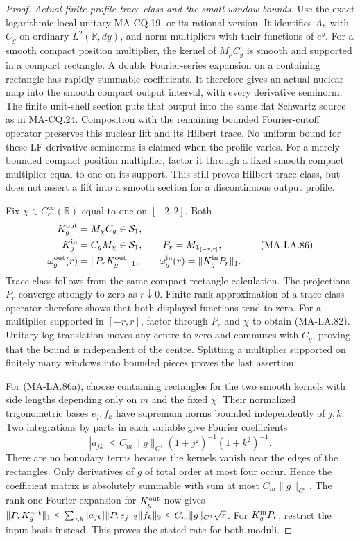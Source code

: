 \begin{proof}
\emph{Actual finite-profile trace class and the small-window bounds.}
Use the exact logarithmic local unitary MA-CQ.19, or its
rational version.  It identifies \(A_h\) with \(C_g\) on
ordinary \(L^2(\mathbb R,dy)\), and norm multipliers with
their functions of \(e^y\).
For a smooth compact position multiplier,
the kernel of \(M_\rho C_g\) is smooth and supported in a
compact rectangle.  A double Fourier-series expansion on a
containing rectangle has rapidly summable coefficients.
It therefore gives an actual nuclear map into the smooth
compact output interval, with every derivative seminorm.
The finite unit-shell section puts that output into the
same flat Schwartz source as in MA-CQ.24.
Composition with the remaining bounded Fourier-cutoff
operator preserves this nuclear lift and its Hilbert trace.
No uniform bound for these LF derivative seminorms is
claimed when the profile varies.
For a merely bounded compact position multiplier, factor it
through a fixed smooth compact multiplier equal to one on
its support.  This still proves Hilbert trace class, but
does not assert a lift into a smooth section for a
discontinuous output profile.

Fix \(\chi\in C_c^\infty(\mathbb R)\) equal to one on
\([-2,2]\).  Both
\[
 \begin{aligned}
 K_g^{\rm out}&=M_\chi C_g\in\mathcal S_1,\\
 K_g^{\rm in}&=C_gM_\chi\in\mathcal S_1,\qquad
 P_r=M_{\mathbf1_{[-r,r]}},\\
 \omega_g^{\rm out}(r)&=\|P_rK_g^{\rm out}\|_1,\qquad
 \omega_g^{\rm in}(r)=\|K_g^{\rm in}P_r\|_1 .
 \end{aligned}
 \tag{MA-LA.86}
\]
Trace class follows from the same compact-rectangle
calculation.  The projections \(P_r\) converge strongly
to zero as \(r\downarrow0\).
Finite-rank approximation of a trace-class operator
therefore shows that both displayed functions tend to zero.
For a multiplier supported in \([-r,r]\), factor through
\(P_r\) and \(\chi\) to obtain (MA-LA.82).
Unitary log translation moves any centre to zero and
commutes with \(C_g\), proving that the bound is independent
of the centre.  Splitting a multiplier supported on finitely
many windows into bounded pieces proves the last assertion.

For (MA-LA.86a), choose containing rectangles for the two
smooth kernels with side lengths depending only on \(m\)
and the fixed \(\chi\).
Their normalized trigonometric bases \(e_j,f_k\) have
supremum norms bounded independently of \(j,k\).
Two integrations by parts in each variable give Fourier
coefficients
\[
 |a_{jk}|
     \le C_m\|g\|_{C^4}(1+j^2)^{-1}(1+k^2)^{-1}.
\]
There are no boundary terms because the kernels vanish
near the edges of the rectangles.
Only derivatives of \(g\) of total order at most four
occur.  Hence the coefficient matrix is absolutely
summable with sum at most \(C_m\|g\|_{C^4}\).
The rank-one Fourier expansion for \(K_g^{\rm out}\)
now gives
\(\|P_rK_g^{\rm out}\|_1
 \le\sum_{j,k}|a_{jk}|\|P_re_j\|_2\|f_k\|_2
 \le C_m\|g\|_{C^4}\sqrt r\).
For \(K_g^{\rm in}P_r\), restrict the input basis instead.
This proves the stated rate for both moduli.


\end{proof}
